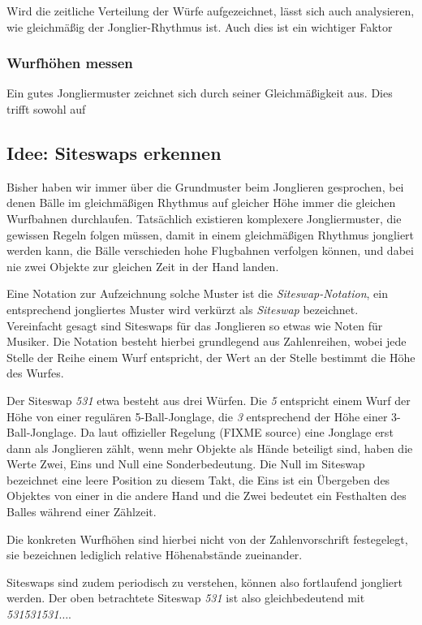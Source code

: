 \documentclass[12pt,a4paper,ngerman]{scrartcl}
\begin{document}
Wird die zeitliche Verteilung der Würfe aufgezeichnet, lässt sich auch analysieren,
wie gleichmäßig der Jonglier-Rhythmus ist. Auch dies ist ein wichtiger Faktor

\subsubsection{Wurfhöhen messen}

Ein gutes Jongliermuster zeichnet sich durch seiner Gleichmäßigkeit aus. Dies trifft
sowohl auf

\subsection{Idee: Siteswaps erkennen}

Bisher haben wir immer über die Grundmuster beim Jonglieren gesprochen, bei denen
Bälle im gleichmäßigen Rhythmus auf gleicher Höhe immer die gleichen Wurfbahnen
durchlaufen. Tatsächlich existieren komplexere Jongliermuster, die gewissen Regeln
folgen müssen, damit in einem gleichmäßigen Rhythmus jongliert werden kann, die Bälle
verschieden hohe Flugbahnen verfolgen können, und dabei nie zwei Objekte zur gleichen
Zeit in der Hand landen.

Eine Notation zur Aufzeichnung solche Muster ist die \textit{Siteswap-Notation}, ein
entsprechend jongliertes Muster wird verkürzt als \textit{Siteswap} bezeichnet.
Vereinfacht gesagt sind Siteswaps für das Jonglieren so etwas wie Noten für Musiker.
Die Notation besteht hierbei grundlegend aus Zahlenreihen, wobei jede Stelle der
Reihe einem Wurf entspricht, der Wert an der Stelle bestimmt die Höhe des Wurfes.

Der Siteswap \textit{531} etwa besteht aus drei Würfen. Die \textit{5} entspricht
einem Wurf der Höhe von einer regulären 5-Ball-Jonglage, die \textit{3} entsprechend
der Höhe einer 3-Ball-Jonglage. Da laut offizieller Regelung (FIXME source) eine
Jonglage erst dann als Jonglieren zählt, wenn mehr Objekte als Hände beteiligt sind,
haben die Werte Zwei, Eins und Null eine Sonderbedeutung. Die Null im Siteswap
bezeichnet eine leere Position zu diesem Takt, die Eins ist ein Übergeben des
Objektes von einer in die andere Hand und die Zwei bedeutet ein Festhalten des Balles
während einer Zählzeit.

Die konkreten Wurfhöhen sind hierbei nicht von der Zahlenvorschrift festegelegt, sie
bezeichnen lediglich relative Höhenabstände zueinander.

Siteswaps sind zudem periodisch zu verstehen, können also fortlaufend jongliert
werden. Der oben betrachtete Siteswap \textit{531} ist also gleichbedeutend mit
\textit{531531531$\dots$}.
\end{document}
